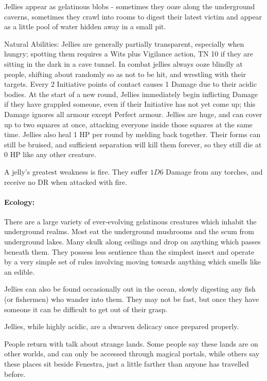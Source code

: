 \label{jelly}
\jelly

Jellies appear as gelatinous blobs - sometimes they ooze along the underground caverns, sometimes they crawl into rooms to digest their latest victim and appear as a little pool of water hidden away in a small pit.

Natural Abilities: Jellies are generally partially transparent, especially when hungry; spotting them requires a Wits plus Vigilance action, TN 10 if they are sitting in the dark in a cave tunnel.  In combat jellies always ooze blindly at people, shifting about randomly so as not to be hit, and wrestling with their targets.  Every 2 Initiative points of contact causes 1 Damage due to their acidic bodies.  At the start of a new round, Jellies immediately begin inflicting Damage if they have grappled someone, even if their Initiative has not yet come up; this Damage ignores all armour except Perfect armour.  Jellies are huge, and can cover up to two squares at once, attacking everyone inside those squares at the same time.  Jellies also heal 1 HP per round by melding back together.  Their forms can still be bruised, and sufficient separation will kill them forever, so they still die at 0 HP like any other creature.

A jelly's greatest weakness is fire.  They suffer $1D6$ Damage from any torches, and receive no DR when attacked with fire.

\paragraph{Ecology:} There are a large variety of ever-evolving gelatinous creatures which inhabit the underground realms.  Most eat the underground mushrooms and the scum from underground lakes.  Many skulk along ceilings and drop on anything which passes beneath them.  They possess less sentience than the simplest insect and operate by a very simple set of rules involving moving towards anything which smells like an edible.

Jellies can also be found occasionally out in the ocean, slowly digesting any fish (or fishermen) who wander into them.  They may not be fast, but once they have someone it can be difficult to get out of their grasp.

Jellies, while highly acidic, are a dwarven delicacy once prepared properly.

\label{umber_hulk}
\umberhulk

People return with talk about strange lands.  Some people say these lands are on other worlds, and can only be accessed through magical portals, while others say these places sit beside Fenestra, just a little farther than anyone has travelled before.

